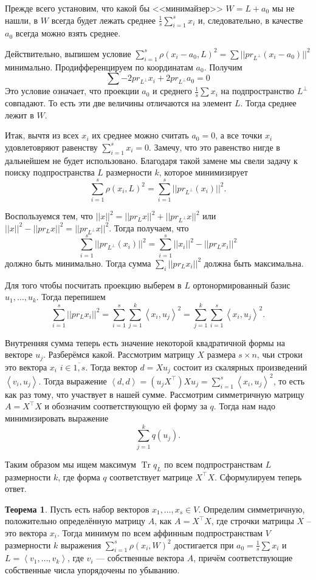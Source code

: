 \documentclass[10pt,a4paper,oneside]{book}
\theoremstyle{definition}
\newtheorem{thm}{{\color{red!40!black} Теорема}}
\newcommand{\ovl}{\overline}
\newcommand{\Tr}{\operatorname{Tr}}
\def\lan{\left\langle }
\def\ran{\right\rangle}
\def\thrm{\begin{thm}}
\def\ethrm{\end{thm}}
\begin{document}
Прежде всего установим, что какой бы <<минимайзер>> $W=L+a_0$ мы не нашли, в $W$ всегда будет лежать среднее $\frac{1}{s}\sum_{i=1}^s x_i$ и, следовательно, в качестве $a_0$ всегда можно взять среднее.

Действительно, выпишем условие $\sum_{i=1}^s \rho(x_i-a_0, L)^2=\sum ||pr_{L^{\bot}} (x_i-a_0)||^2$  минимально.  Продифференцируем по координатам $a_0$. Получим $$\sum -2pr_{L^{\bot}} x_i + 2 pr_{L^{\bot}} a_0=0$$
 Это условие означает, что проекции $a_0$ и среднего $\frac{1}{s}\sum x_i$ на подпространство $L^{\bot}$ совпадают. То есть эти две величины отличаются на элемент $L$. Тогда среднее лежит в $W$. 

Итак, вычтя из всех $x_i$ их среднее можно считать $a_0=0$, а все точки $x_i$ удовлетовряют равенству $\sum_{i=1}^s x_i=0$. Замечу, что это равенство нигде в дальнейшем не будет использовано. Благодаря такой замене мы свели задачу к поиску подпространства $L$ размерности $k$, которое минимизирует 
$$\sum_{i=1}^s \rho(x_i, L)^2=\sum_{i=1}^s ||pr_{L^{\bot}} (x_i)||^2.$$

Воспользуемся тем, что $||x||^2=||pr_L x||^2+||pr_{L^{\bot}} x||^2$ или $||x||^2-||pr_L x||^2=||pr_{L^{\bot}} x||^2$. Тогда получаем, что
$$\sum_{i=1}^s ||pr_{L^{\bot}}(x_i)||^2=\sum_{i=1}^s ||x_i||^2-||pr_L x_i||^2$$
должно быть минимально. Тогда сумма $\sum_i ||pr_L x_i||^2$ должна быть максимальна.


Для того чтобы посчитать проекцию выберем в $L$ ортонормированный базис $u_1,\dots,u_k$. Тогда перепишем
$$\sum_{i=1}^s ||pr_L x_i||^2=\sum_{i=1}^s\sum_{j=1}^k \lan x_i,u_j\ran^2=\sum_{j=1}^k \sum_{i=1}^s \lan x_i,u_j\ran^2.$$

Внутренняя сумма теперь есть значение некоторой квадратичной формы на векторе $u_j$. Разберёмся какой. Рассмотрим матрицу $X$ размера $s\times n$, чьи строки это  вектора $x_i$ $i\in\ovl{1,s}$. Тогда вектор $d=Xu_j$ состоит из скалярных произведений  $\lan v_i, u_j\ran$. Тогда выражение $\lan d,d\ran = (u_jX^{\top})Xu_j = \sum_{i=1}^s \lan x_i,u_j\ran^2$, то есть как раз тому, что участвует в нашей сумме. Рассмотрим симметричную матрицу $A=X^{\top}X$ и обозначим соответствующую ей форму за $q$. Тогда нам надо минимизировать выражение
$$\sum_{j=1}^k q(u_j).$$



Таким образом мы ищем максимум $\Tr q_{L}$ по всем подпространствам $L$ размерности $k$, где форма $q$ соответствует матрице $X^{\top} X$. 
Сформулируем теперь ответ. 


\thrm  Пусть есть набор векторов $x_1,\dots,x_s \in V$. Определим симметричную, положительно определённую матрицу $A$, как $A=X^{\top}X$, где строчки матрицы $X$ -- это вектора $x_i$. Тогда минимум по всем аффинным подпространствам $V$ размерности $k$ выражения $\sum_{i=1}^s \rho(x_i,W)^2$ достигается при $a_0=\frac{1}{s}\sum x_i$  и $L=\lan v_1,\dots,v_k\ran$, где $v_i$ --- собственные вектора $A$, причём соответствующие собственные числа упорядочены по убыванию. 
\ethrm
\end{document}
